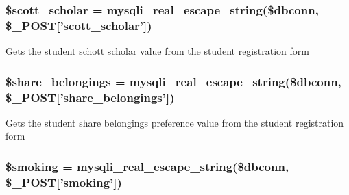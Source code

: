 \hypertarget{user__view_2validate_2studentVal_8php_aeba3fa7111a05390371249cf7515b517}{
\subsubsection[{\$scott\-\_\-scholar}]{\setlength{\rightskip}{0pt plus 5cm}\$scott\-\_\-scholar = mysqli\-\_\-real\-\_\-escape\-\_\-string(\$dbconn, \$\-\_\-\-P\-O\-S\-T\mbox{[}'scott\-\_\-scholar'\mbox{]})}}\label{user__view_2validate_2studentVal_8php_aeba3fa7111a05390371249cf7515b517}
\-Gets the student schott scholar value from the student registration form \hypertarget{user__view_2validate_2studentVal_8php_ad62de11903542434007800bf0bc24594}{
\subsubsection[{\$share\-\_\-belongings}]{\setlength{\rightskip}{0pt plus 5cm}\$share\-\_\-belongings = mysqli\-\_\-real\-\_\-escape\-\_\-string(\$dbconn, \$\-\_\-\-P\-O\-S\-T\mbox{[}'share\-\_\-belongings'\mbox{]})}}\label{user__view_2validate_2studentVal_8php_ad62de11903542434007800bf0bc24594}
\-Gets the student share belongings preference value from the student registration form \hypertarget{user__view_2validate_2studentVal_8php_a266c5c8c450a524f2b62297da83a6461}{
\subsubsection[{\$smoking}]{\setlength{\rightskip}{0pt plus 5cm}\$smoking = mysqli\-\_\-real\-\_\-escape\-\_\-string(\$dbconn, \$\-\_\-\-P\-O\-S\-T\mbox{[}'smoking'\mbox{]})}}\label{user__view_2validate_2studentVal_8php_a266c5c8c450a524f2b62297da83a6461}
